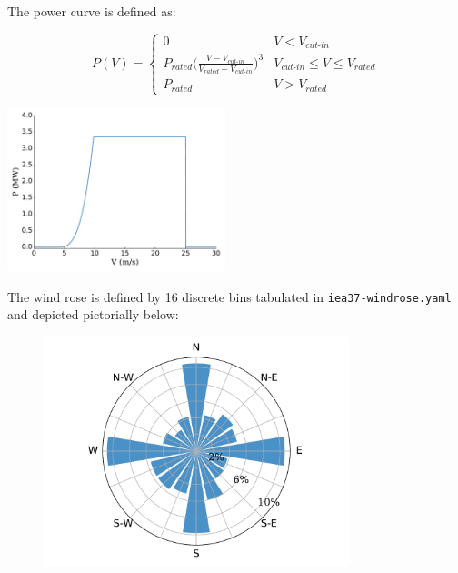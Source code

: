 \documentclass{article}
\begin{document}
        The power curve is defined as:   

        \begin{minipage}{0.5\textwidth}
            \begin{equation*}
                P(V) = 
                \begin{cases} 
                    0 & V < V_{\textit{cut-in}} \\
                    P_{\textit{rated}}\bigg(\frac{V-V_{\textit{cut-in}}}{V_{\textit{rated}}-V_{\textit{cut-in}}}\bigg)^3 & V_{\textit{cut-in}}\leq V \leq V_{\textit{rated}} \\
                    P_{\textit{rated}} & V > V_{\textit{rated}}
                \end{cases}
            \label{eq:power}
            \end{equation*}
        \end{minipage}\quad
        \begin{minipage}{0.5\textwidth}
            \includegraphics[width=2.5in]{iea37-335mw-pcurve}
        \end{minipage}


        The wind rose is defined by 16 discrete bins tabulated in \texttt{iea37-windrose.yaml} and depicted pictorially below:
        \vspace{-1em}
        \begin{figure}[h!]
            \centering
            \includegraphics[width=3.5in]{iea37-windrose}
        \end{figure}
        \vspace{-2em}
\end{document}
